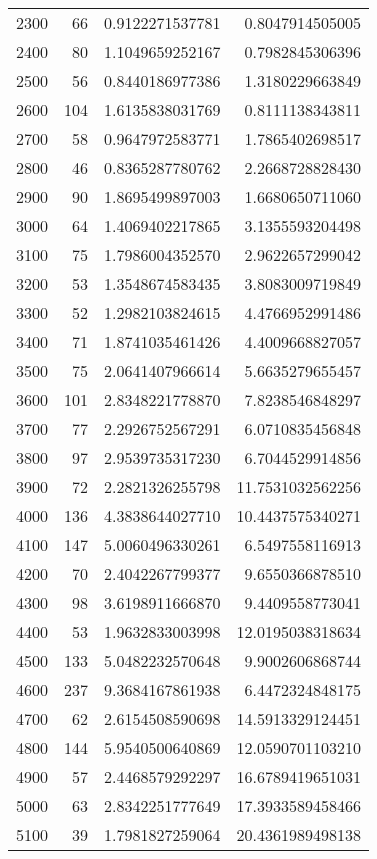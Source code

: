 \begin{longtable}{lrrr}
2300 & 66 & 0.9122271537781 & 0.8047914505005 \\
2400 & 80 & 1.1049659252167 & 0.7982845306396 \\
2500 & 56 & 0.8440186977386 & 1.3180229663849 \\
2600 & 104 & 1.6135838031769 & 0.8111138343811 \\
2700 & 58 & 0.9647972583771 & 1.7865402698517 \\
2800 & 46 & 0.8365287780762 & 2.2668728828430 \\
2900 & 90 & 1.8695499897003 & 1.6680650711060 \\
3000 & 64 & 1.4069402217865 & 3.1355593204498 \\
3100 & 75 & 1.7986004352570 & 2.9622657299042 \\
3200 & 53 & 1.3548674583435 & 3.8083009719849 \\
3300 & 52 & 1.2982103824615 & 4.4766952991486 \\
3400 & 71 & 1.8741035461426 & 4.4009668827057 \\
3500 & 75 & 2.0641407966614 & 5.6635279655457 \\
3600 & 101 & 2.8348221778870 & 7.8238546848297 \\
3700 & 77 & 2.2926752567291 & 6.0710835456848 \\
3800 & 97 & 2.9539735317230 & 6.7044529914856 \\
3900 & 72 & 2.2821326255798 & 11.7531032562256 \\
4000 & 136 & 4.3838644027710 & 10.4437575340271 \\
4100 & 147 & 5.0060496330261 & 6.5497558116913 \\
4200 & 70 & 2.4042267799377 & 9.6550366878510 \\
4300 & 98 & 3.6198911666870 & 9.4409558773041 \\
4400 & 53 & 1.9632833003998 & 12.0195038318634 \\
4500 & 133 & 5.0482232570648 & 9.9002606868744 \\
4600 & 237 & 9.3684167861938 & 6.4472324848175 \\
4700 & 62 & 2.6154508590698 & 14.5913329124451 \\
4800 & 144 & 5.9540500640869 & 12.0590701103210 \\
4900 & 57 & 2.4468579292297 & 16.6789419651031 \\
5000 & 63 & 2.8342251777649 & 17.3933589458466 \\
5100 & 39 & 1.7981827259064 & 20.4361989498138 \\
\end{longtable}
